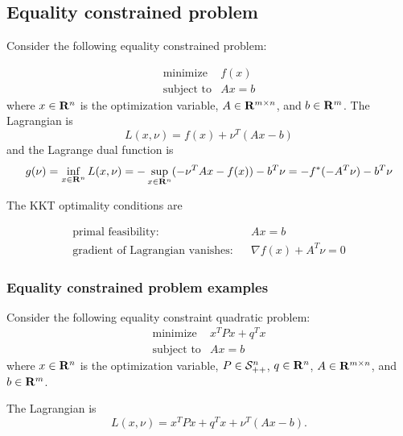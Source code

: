 \subsection{Equality constrained problem}

Consider the following equality constrained problem:

\begin{equation}
\begin{array}{ll}
\mbox{minimize} & f(x)
\\
\mbox{subject to} & Ax = b
\end{array}
\end{equation}
where $x\in\mathbf{R}^n$ is the optimization variable,
$A\in\mathbf{R}^{m\times n}$,
and
$b\in\mathbf{R}^{m}$.
The Lagrangian is
\begin{equation}
L(x,\nu) = f(x) + \nu^T (Ax-b)
\end{equation}
and the Lagrange dual function is
\begin{equation}
g(\nu) = \inf_{x\in\mathbf{R}^n} L(x,\nu) = - \sup_{x\in\mathbf{R}^n} (-\nu^T Ax -f(x)) -b^T \nu
= - f^\ast(-A^T\nu) - b^T \nu
\end{equation}

The KKT optimality conditions are

\begin{eqnarray}
\mbox{primal feasibility:}
&&Ax = b
\\
\mbox{gradient of Lagrangian vanishes:}
&& \nabla f(x) + A^T\nu = 0
\end{eqnarray}

\subsubsection{Equality constrained problem examples}

Consider the following equality constraint quadratic problem:
\begin{equation}
\begin{array}{ll}
\mbox{minimize} & x^T P x + q^Tx
\\
\mbox{subject to} & Ax = b
\end{array}
\end{equation}
where
$x\in\mathbf{R}^n$ is the optimization variable,
$P\in\mathcal{S}_{++}^{n}$,
$q\in\mathbf{R}^{n}$,
$A\in\mathbf{R}^{m\times n}$,
and
$b\in\mathbf{R}^{m}$.

The Lagrangian is
\begin{equation}
L(x,\nu) = x^T P x + q^T x + \nu^T (Ax-b).
\end{equation}

